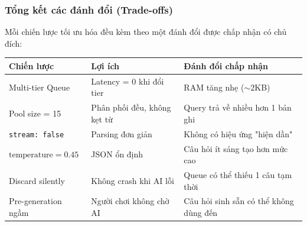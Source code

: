 \subsubsection{Tổng kết các đánh đổi (Trade-offs)}
Mỗi chiến lược tối ưu hóa đều kèm theo một đánh đổi được chấp nhận có chủ đích:

\begin{table}[H]
\centering
\small
\begin{tabularx}{\textwidth}{|l| X |X|}
\toprule
\textbf{Chiến lược} & \textbf{Lợi ích} & \textbf{Đánh đổi chấp nhận} \\
\midrule
Multi-tier Queue & Latency = 0 khi đổi tier & RAM tăng nhẹ ($\sim2$KB) \\
Pool size = 15 & Phân phối đều, không kẹt từ & Query trả về nhiều hơn 1 bản ghi \\
\texttt{stream: false} & Parsing đơn giản & Không có hiệu ứng "hiện dần" \\
$\text{temperature} = 0.45$ & JSON ổn định & Câu hỏi ít sáng tạo hơn mức cao \\
Discard silently & Không crash khi AI lỗi & Queue có thể thiếu 1 câu tạm thời \\
Pre-generation ngầm & Người chơi không chờ AI & Câu hỏi sinh sẵn có thể không dùng đến \\
\bottomrule
\end{tabularx}
\end{table}